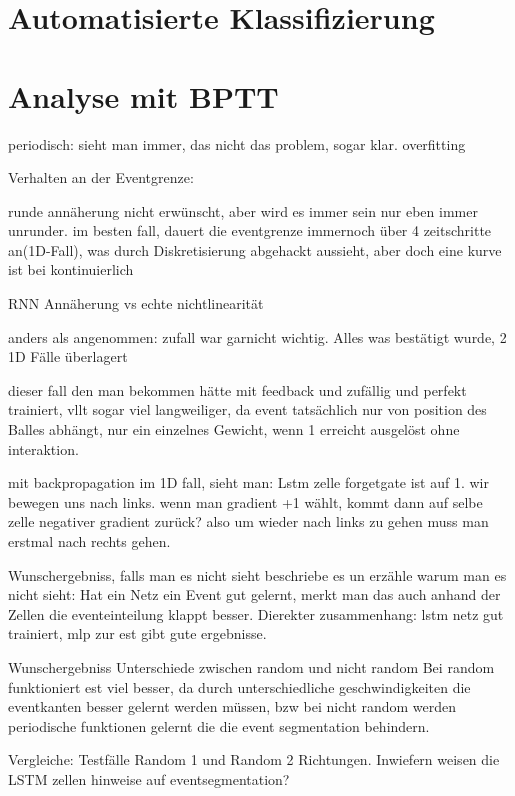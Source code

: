 \cite{bib:graves}

\section{Automatisierte Klassifizierung}




\section{Analyse mit BPTT}

periodisch: sieht man immer, das nicht das problem, sogar klar. overfitting

Verhalten an der Eventgrenze:

runde annäherung nicht erwünscht, aber wird es immer sein nur eben immer unrunder. im besten fall, dauert die eventgrenze immernoch über 4 zeitschritte an(1D-Fall), was durch Diskretisierung abgehackt aussieht, aber doch eine kurve ist bei kontinuierlich




RNN Annäherung vs echte nichtlinearität

anders als angenommen: zufall war garnicht wichtig. Alles was bestätigt wurde, 2 1D Fälle überlagert

dieser fall den man bekommen hätte mit feedback und zufällig und perfekt trainiert, vllt sogar viel langweiliger, da event tatsächlich nur von position des Balles abhängt, nur ein einzelnes Gewicht, wenn 1 erreicht ausgelöst ohne interaktion. 


mit backpropagation im 1D fall, sieht man: Lstm zelle forgetgate ist auf 1. wir bewegen uns nach links. wenn man gradient +1 wählt, kommt dann auf selbe zelle negativer gradient zurück? also um wieder nach links zu gehen muss man erstmal nach rechts gehen. 

Wunschergebniss, falls man es nicht sieht beschriebe es un erzähle warum man es nicht sieht: 
Hat ein Netz ein Event gut gelernt, merkt man das auch anhand der Zellen die eventeinteilung klappt besser.
Dierekter zusammenhang: lstm netz gut trainiert, mlp zur est gibt gute ergebnisse.

Wunschergebniss
Unterschiede zwischen random und nicht random
Bei random funktioniert est viel besser,  da  durch unterschiedliche geschwindigkeiten die eventkanten besser gelernt werden müssen, bzw bei nicht random werden periodische funktionen gelernt die die event segmentation behindern.

Vergleiche: Testfälle Random 1 und Random 2 Richtungen. Inwiefern weisen die LSTM zellen hinweise auf eventsegmentation? 

